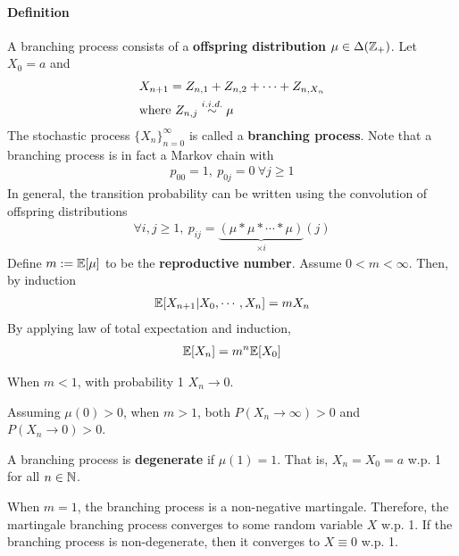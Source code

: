 \documentclass{article}
\begin{document}
	\paragraph{Definition} A branching process consists of a \textbf{offspring distribution} $\mu \in \Delta(\mathbb{Z}_+)$. Let $X_0 = a$ and 
	\begin{align}
		&X_{n+1} = Z_{n, 1} + Z_{n, 2} + \cdots + Z_{n, X_n} \\
		&\text{{where }} Z_{n, j} \overset{i.i.d.}{\sim} \mu
	\end{align}
	The stochastic process $\{X_n\}_{n=0}^\infty$ is called a \textbf{branching process}. Note that a branching process is in fact a Markov chain with
	\begin{align}
		p_{00} = 1,\ p_{0j} = 0\ \forall j \geq 1
	\end{align}
	In general, the transition probability can be written using the convolution of offspring distributions
	\begin{align}
		\forall i, j \geq 1,\ p_{ij} = \underbrace{(\mu * \mu * \cdots * \mu)}_{\times i}(j)
	\end{align}
	Define $m := \mathbb{E}[{\mu}]$ to be the \textbf{reproductive number}. Assume $0 < m < \infty$. Then, by induction
	\begin{align}
		\mathbb{E}[{X_{n+1}|X_0, \cdots, X_n}] = m X_n
	\end{align}
	By applying law of total expectation and induction,
	\begin{align}
		\mathbb{E}[{X_n}] = m^n \mathbb{E}[{X_0}]
	\end{align}
	\begin{proposition}
		When $m < 1$, with probability 1 $X_n \to 0$.
	\end{proposition}
	
	\begin{proposition}
		Assuming $\mu(0) > 0$, when $m > 1$, both $P(X_n \to \infty) > 0$ and $P(X_n \to 0) > 0$.
	\end{proposition}
	
	\begin{definition}
		A branching process is \textbf{degenerate} if $\mu(1) = 1$. That is, $X_n = X_0 = a$ w.p. 1 for all $n \in \mathbb{N}$.
	\end{definition}
	
	\begin{proposition}
		When $m=1$, the branching process is a non-negative martingale. Therefore, the martingale branching process converges to some random variable $X$ w.p. 1. If the branching process is non-degenerate, then it converges to $X \equiv 0$ w.p. 1.
	\end{proposition}
	
\end{document}
